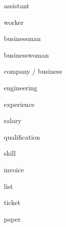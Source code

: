 \documentclass[avery5371,grid,frame]{flashcards}
\begin{document}
\begin{flashcard}{\LARGE assistant}
\LARGE {}
\end{flashcard}
\begin{flashcard}{\LARGE worker}
\LARGE {}
\end{flashcard}
\begin{flashcard}{\LARGE businessman}
\LARGE {}
\end{flashcard}
\begin{flashcard}{\LARGE businesswoman}
\LARGE {}
\end{flashcard}
\begin{flashcard}{\LARGE company / business}
\LARGE {}
\end{flashcard}
\begin{flashcard}{\LARGE engineering}
\LARGE {}
\end{flashcard}
\begin{flashcard}{\LARGE experience}
\LARGE {}
\end{flashcard}
\begin{flashcard}{\LARGE salary}
\LARGE {}
\end{flashcard}
\begin{flashcard}{\LARGE qualification}
\LARGE {}
\end{flashcard}
\begin{flashcard}{\LARGE skill}
\LARGE {}
\end{flashcard}
\begin{flashcard}{\LARGE invoice}
\LARGE {}
\end{flashcard}
\begin{flashcard}{\LARGE list}
\LARGE {}
\end{flashcard}
\begin{flashcard}{\LARGE ticket}
\LARGE {}
\end{flashcard}
\begin{flashcard}{\LARGE paper}
\LARGE {}
\end{flashcard}
\end{document}
